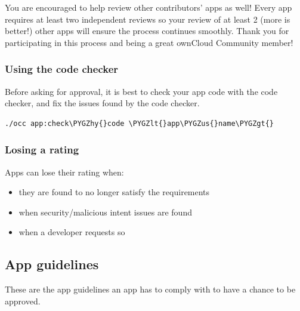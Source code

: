 \documentclass[letterpaper,10pt,english]{sphinxmanual}
\def\PYGZus{\char`\_}
\def\PYGZlt{\char`\<}
\def\PYGZgt{\char`\>}
\def\PYGZhy{\char`\-}
\begin{document}
You are encouraged to help review other contributors' apps as well! Every app requires at least two independent reviews so your review of at least 2 (more is better!) other apps will ensure the process continues smoothly. Thank you for participating in this process and being a great ownCloud Community member!


\subsubsection{Using the code checker}
\label{app/publishing:using-the-code-checker}
Before asking for approval, it is best to check your app code with the code checker, and fix the issues found by the code checker.

\begin{Verbatim}[commandchars=\\\{\}]
./occ app:check\PYGZhy{}code \PYGZlt{}app\PYGZus{}name\PYGZgt{}
\end{Verbatim}


\subsubsection{Losing a rating}
\label{app/publishing:losing-a-rating}
Apps can lose their rating when:
\begin{itemize}
\item {} 
they are found to no longer satisfy the requirements

\item {} 
when security/malicious intent issues are found

\item {} 
when a developer requests so

\end{itemize}


\subsection{App guidelines}
\label{app/publishing:app-guidelines}
These are the app guidelines an app has to comply with to have a chance to be approved.
\end{document}
